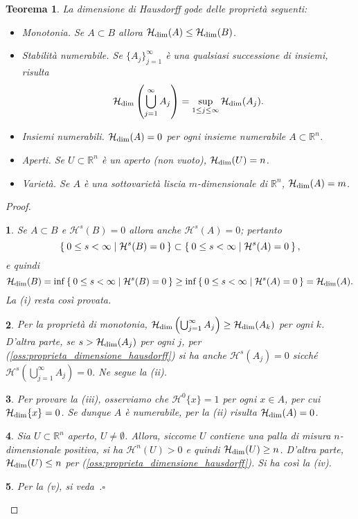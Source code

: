 \documentclass[a4paper,10pt,openright,oneside]{book}
\theoremstyle{theoremstyle}
\newtheorem{teorema}{Teorema}[section]
\theoremstyle{theoremstylewoheader}
\theoremstyle{theoremstyle}
\theoremstyle{proofsecstyle}
\newtheorem{proofsec}{}
\theoremstyle{nonumberplain}
\newtheorem{proof}{Dim.}
\newcommand{\RR}{\ensuremath{\mathbb{R}}}
\newcommand{\Haus}{\ensuremath{\mathcal{H}}}
\newcommand{\Hausdim}{\ensuremath{\Haus_\textup{dim}}}
\renewcommand{\qedsymbol}{\ensuremath{\square}}
\newcommand{\qed}{\unskip\nobreak\hfill\nobreak\hspace{.5em}\qedsymbol}
\begin{document}
\begin{teorema}
\label{thm:proprieta_dimensione_hausdorff}
La dimensione di Hausdorff gode delle proprietà seguenti:
\begin{itemize}
\item[(i)] \emph{Monotonia.} Se $A \subset B$ allora $\Hausdim(A) \le \Hausdim(B)$.
\item[(ii)] \emph{Stabilità numerabile.} Se $\{A_j\}_{j=1}^\infty$ è una qualsiasi successione di insiemi, risulta
\[
\Hausdim\left(\bigcup_{j=1}^\infty A_j\right) = \sup_{1 \le j \le \infty} \Hausdim(A_j).
\]
\item[(iii)] \emph{Insiemi numerabili.} $\Hausdim(A) = 0$ per ogni insieme numerabile $A \subset \RR^n$.
\item[(iv)] \emph{Aperti.} Se $U \subset \RR^n$ è un aperto (non vuoto), $\Hausdim(U) = n$.
\item[(v)] \emph{Varietà.} Se $A$ è una sottovarietà liscia $m$-dimensionale di $\RR^n$, $\Hausdim(A) = m$.
\end{itemize}
\end{teorema}

\begin{proof}
\begin{proofsec}
Se $A \subset B$ e $\Haus^s(B) = 0$ allora anche $\Haus^s(A) = 0$; pertanto
\[
\Set{ 0 \le s < \infty | \Haus^s(B) = 0 } \subset \Set{ 0 \le s < \infty | \Haus^s(A) = 0 },
\]
e quindi
\[
\Hausdim(B) = \inf\Set{ 0 \le s < \infty | \Haus^s(B) = 0 } \ge \inf\Set{ 0 \le s < \infty | \Haus^s(A) = 0 } = \Hausdim(A).
\]
La (i) resta così provata.
\end{proofsec}

\begin{proofsec}
Per la proprietà di monotonia, $\Hausdim\left(\bigcup_{j=1}^\infty A_j\right) \ge \Hausdim(A_k)$ per ogni $k$. D'altra parte, se $s > \Hausdim(A_j)$ per ogni $j$, per (\ref{oss:proprieta_dimensione_hausdorff}) si ha anche $\Haus^s(A_j) = 0$ sicché $\Haus^s\left(\bigcup_{j=1}^\infty A_j\right) = 0$. Ne segue la (ii). 
\end{proofsec}

\begin{proofsec}
Per provare la (iii), osserviamo che $\Haus^0\{x\} = 1$ per ogni $x \in A$, per cui $\Hausdim\{x\} = 0$. Se dunque $A$ è numerabile, per la (ii) risulta $\Hausdim(A) = 0$.
\end{proofsec}

\begin{proofsec}
Sia $U \subset \RR^n$ aperto, $U \ne \emptyset$. Allora, siccome $U$ contiene una palla di misura $n$-dimensionale positiva, si ha $\Haus^n(U) > 0$ e quindi $\Hausdim(U) \ge n$. D'altra parte, $\Hausdim(U) \le n$ per (\ref{oss:proprieta_dimensione_hausdorff}). Si ha così la (iv). 
\end{proofsec}

\begin{proofsec}
Per la (v), si veda~\cite[pag.~32]{falconer}.\qed
\end{proofsec}
\end{proof}
\end{document}
